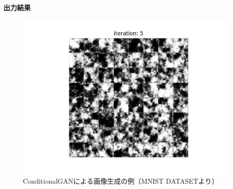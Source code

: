 \documentclass{jarticle}
\begin{document}
\textbf{出力結果}
\begin{figure}[h]
\centering
\includegraphics[width=12cm]{0005.jpg}
\caption{ConditionalGANによる画像生成の例（MNIST DATASETより）}
\label{GAN7}
\end{figure}


\end{document}
